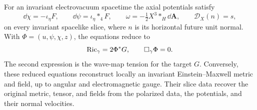 \begin{proposition}
\label{a:quotient-proposition}
For an invariant electrovacuum spacetime the axial potentials
satisfy
\begin{equation}\label{a:quotient}
 \dd\chi=-\iota_\eta F,\qquad
 \dd\psi=\iota_\eta *_4F,\qquad
 \omega=-\tfrac12X^3*_H\dd\mathbf A,
 \qquad \mathcal D_X(n)=s,
\end{equation}
on every invariant spacelike slice, where $n$ is its horizontal
future unit normal.  With $\Phi=(u,\psi,\chi,z)$, the equations
reduce to
\begin{equation}\label{a:wave}
 \operatorname{Ric}_\gamma=2\Phi^*G,
 \qquad \Box_\gamma\Phi=0.
\end{equation}
The second expression is the wave-map tension for the target
$G$.  Conversely, these reduced equations reconstruct locally
an invariant Einstein--Maxwell metric and field, up to angular
and electromagnetic gauge.  Their slice data recover the
original metric, tensor, and fields from the polarized data,
the potentials, and their normal velocities.
\end{proposition}

